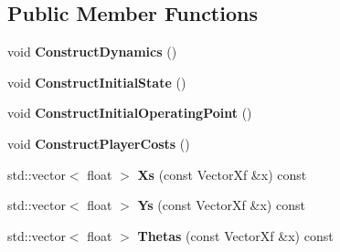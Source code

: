 \subsection*{Public Member Functions}
\begin{DoxyCompactItemize}
\item 
void {\bfseries Construct\+Dynamics} ()\hypertarget{classilqgames_1_1_roundabout_merging_example_a7c5c441a9c33446098869fe5da66b856}{}\label{classilqgames_1_1_roundabout_merging_example_a7c5c441a9c33446098869fe5da66b856}

\item 
void {\bfseries Construct\+Initial\+State} ()\hypertarget{classilqgames_1_1_roundabout_merging_example_a4443f8ff203923d1e61fef7312a87436}{}\label{classilqgames_1_1_roundabout_merging_example_a4443f8ff203923d1e61fef7312a87436}

\item 
void {\bfseries Construct\+Initial\+Operating\+Point} ()\hypertarget{classilqgames_1_1_roundabout_merging_example_a47538f4cde34cba36a03f3ea75306ea7}{}\label{classilqgames_1_1_roundabout_merging_example_a47538f4cde34cba36a03f3ea75306ea7}

\item 
void {\bfseries Construct\+Player\+Costs} ()\hypertarget{classilqgames_1_1_roundabout_merging_example_ade7fa5e16ce87e68841d3f9c311a1f4e}{}\label{classilqgames_1_1_roundabout_merging_example_ade7fa5e16ce87e68841d3f9c311a1f4e}

\item 
std\+::vector$<$ float $>$ {\bfseries Xs} (const Vector\+Xf \&x) const \hypertarget{classilqgames_1_1_roundabout_merging_example_adbe4b0b31b690b4a6bea6a5677f2db3f}{}\label{classilqgames_1_1_roundabout_merging_example_adbe4b0b31b690b4a6bea6a5677f2db3f}

\item 
std\+::vector$<$ float $>$ {\bfseries Ys} (const Vector\+Xf \&x) const \hypertarget{classilqgames_1_1_roundabout_merging_example_ab2f826a33b86e86199327f78f7572245}{}\label{classilqgames_1_1_roundabout_merging_example_ab2f826a33b86e86199327f78f7572245}

\item 
std\+::vector$<$ float $>$ {\bfseries Thetas} (const Vector\+Xf \&x) const \hypertarget{classilqgames_1_1_roundabout_merging_example_a3f8e894816106634504dd2d2e75cc73a}{}\label{classilqgames_1_1_roundabout_merging_example_a3f8e894816106634504dd2d2e75cc73a}

\end{DoxyCompactItemize}

